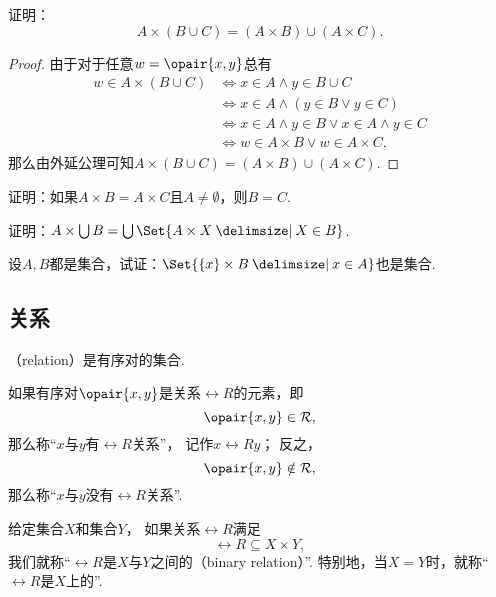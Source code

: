 \begin{example}
证明：\begin{equation}
	A \times (B \cup C) = (A \times B) \cup (A \times C).
\end{equation}
\begin{proof}
由于对于任意\(w = \opair{x,y}\)总有
\begin{align*}
	w \in A \times (B \cup C)
	&\iff x \in A \land y \in B \cup C \\
	&\iff x \in A \land (y \in B \lor y \in C) \\
	&\iff x \in A \land y \in B \lor x \in A \land y \in C \\
	&\iff w \in A \times B \lor w \in A \times C,
\end{align*}
那么由外延公理可知\(A \times (B \cup C) = (A \times B) \cup (A \times C)\).
\end{proof}
\end{example}

\begin{example}
证明：如果\(A \times B = A \times C\)且\(A \neq \emptyset\)，则\(B = C\).
\end{example}

\begin{example}
证明：\(A \times \bigcup B = \bigcup\Set{ A \times X \given X \in B }\).
\end{example}

\begin{example}
设\(A,B\)都是集合，试证：\(\Set{ \{x\} \times B \given x \in A }\)也是集合.
\end{example}

\subsection{关系}
\begin{definition}
（relation）是有序对的集合.
\end{definition}

如果有序对\(\opair{x,y}\)是关系\(\rel{R}\)的元素，即\[
	\opair{x,y} \in \rel{R},
\]
那么称“\(x\)与\(y\)有\(\rel{R}\)关系”，
记作\(x\rel{R}y\)；
反之，\[
	\opair{x,y} \notin \rel{R},
\]
那么称“\(x\)与\(y\)没有\(\rel{R}\)关系”.

给定集合\(X\)和集合\(Y\)，
如果关系\(\rel{R}\)满足\[
	\rel{R} \subseteq X \times Y,
\]
我们就称“\(\rel{R}\)是\(X\)与\(Y\)之间的（binary relation）”.
特别地，当\(X = Y\)时，就称“\(\rel{R}\)是\(X\)上的”.

